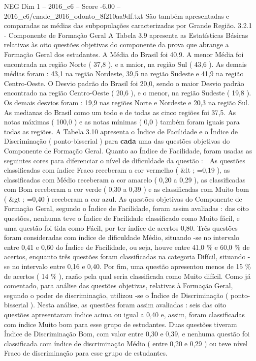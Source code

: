 \begin{textsample}{NEG Dim 1 – 2016\_c6 – Score -6.00 – 2016\_c6/enade\_2016\_odonto\_8f210aa9df.txt}
São também apresentadas e comparadas as médias das subpopulações caracterizadas por Grande Região. 3.2.1 - Componente de Formação Geral A Tabela 3.9 apresenta as Estatísticas Básicas relativas às oito questões objetivas do componente da prova que abrange a Formação Geral dos estudantes.
A Média do Brasil foi 40,9.
A menor Média foi encontrada na região Norte ( 37,8 ), e a maior, na região Sul ( 43,6 ).
As demais médias foram : 43,1 na região Nordeste, 39,5 na região Sudeste e 41,9 na região Centro-Oeste.
O Desvio padrão do Brasil foi 20,0, sendo o maior Desvio padrão encontrado na região Centro-Oeste ( 20,6 ), e o menor, na região Sudeste ( 19,8 ).
Os demais desvios foram : 19,9 nas regiões Norte e Nordeste e 20,3 na região Sul.
As medianas do Brasil como um todo e de todas as cinco regiões foi 37,5.
As notas máximas ( 100,0 ) e as notas mínimas ( 0,0 ) também foram iguais para todas as regiões.
A Tabela 3.10 apresenta o Índice de Facilidade e o Índice de Discriminação ( ponto-bisserial ) para \textbf{cada} uma das questões objetivas do Componente de Formação Geral.
Quanto ao Índice de Facilidade, foram usadas as seguintes cores para diferenciar o nível de dificuldade da questão :  As questões classificadas com índice Fraco receberam a cor vermelho ( \&lt ; =0,19 ), as classificadas com Médio receberam a cor amarelo ( 0,20 a 0,29 ), as classificadas com Bom receberam a cor verde ( 0,30 a 0,39 ) e as classificadas com Muito bom ( \&gt ; =0,40 ) receberam a cor azul.
As questões objetivas do Componente de Formação Geral, segundo o Índice de Facilidade, foram assim avaliadas : das oito questões, nenhuma teve o Índice de Facilidade classificado como Muito fácil, e uma questão foi tida como Fácil, por ter índice de acertos 0,80.
Três questões foram consideradas com índice de dificuldade Médio, situando -se no intervalo entre 0,41 e 0,60 do Índice de Facilidade, ou seja, houve entre 41,0 \% e 60,0 \% de acertos, enquanto três questões foram classificadas na categoria Difícil, situando -se no intervalo entre 0,16 e 0,40.
Por fim, uma questão apresentou menos de 15 \% de acertos ( 14 \% ), razão pela qual seria classificada como Muito difícil.
Como já comentado, para análise das questões objetivas, relativas à Formação Geral, segundo o poder de discriminação, utilizou -se o Índice de Discriminação ( ponto-bisserial ).
Nesta análise, as questões foram assim avaliadas : seis das oito questões apresentaram índice acima ou igual a 0,40 e, assim, foram classificadas com índice Muito bom para esse grupo de estudantes.
Duas questões tiveram Índice de Discriminação Bom, com valor entre 0,30 e 0,39, e nenhuma questão foi classificada com índice de discriminação Médio ( entre 0,20 e 0,29 ) ou teve nível Fraco de discriminação para esse grupo de estudantes.

\end{textsample}
